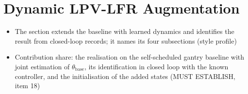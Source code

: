%
\section{Dynamic LPV-LFR Augmentation}\label{sec:augmentation}
\ifdraft
\begin{itemize}
\item The section extends the baseline with learned dynamics and identifies the result from closed-loop records; it names its four subsections (style profile)
\item Contribution share: the realisation on the self-scheduled gantry baseline with joint estimation of $\theta_{\mathrm{base}}$, its identification in closed loop with the known controller, and the initialisation of the added states (MUST ESTABLISH, item 18)
\end{itemize}
\fi

